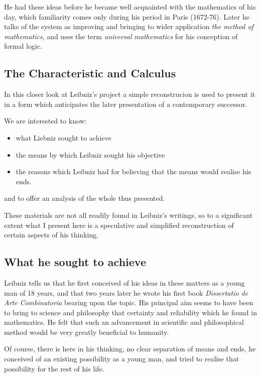 He had these ideas before he became well acquainted with the mathematics of his day,
which familiarity comes only during his period in Paris (1672-76).
Later he talks of the system as improving and bringing to wider application \emph{the method of mathematics},
and uses the term \emph{universal mathematics} for his conception of formal logic.

\subsection{The Characteristic and Calculus}

In this closer look at Leibniz's project a simple reconstrucion is used to present
it in a form which anticipates the later presentation of a contemporary successor.

We are interested to know:

\begin{itemize}
\item what Liebniz sought to achieve
\item the means by which Leibniz sought his objective
\item the reasons which Leibniz had for believing that the means would realise his ends.
\end{itemize}

and to offer an analysis of the whole thus presented.

These materials are not all readily found in Leibniz's writings, so to a significant
extent what I present here is a speculative and simplified reconstruction of certain
aspects of his thinking.

\subsection{What he sought to achieve}

Leibniz tells us that he first conceived of his ideas in these matters as a young man
of 18 years, and that two years later he wrote his first book \emph{Dissertatio de Arte Combinatoria}\cite{leibniz66}
bearing upon the topic.
His principal aim seems to have been to bring to science and philosophy that certainty and
reliability which he found in mathematics.
He felt that such an advancement in scientific and philosophical method would be very greatly
beneficial to humanity.

Of course, there is here in his thinking, no clear separation of means and ends,
he conceived of an existing possibility as a young man, and tried to realise that
possibility for the rest of his life.

